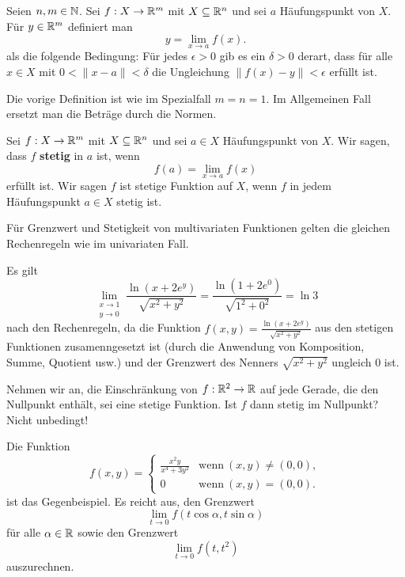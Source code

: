 \begin{defn}
	Seien $n,m \in \mathbb{N}$. 
	Sei $f : X \to \mathbb{R}^m$ mit $X \subseteq \mathbb{R}^n$ und sei $a$ Häufungspunkt von $X$. Für $y \in \mathbb{R}^m$ definiert man 
	\[
		y = \lim_{x \to a} f(x). 
	\]
	als die folgende Bedingung: Für jedes $\epsilon>0$ gib es ein $\delta>0$ derart, dass für alle $x \in X$ mit $0 < \|x - a\| < \delta$ die Ungleichung $\|f(x) - y\| < \epsilon$ erfüllt ist.  
\end{defn} 

\begin{bem}
	Die vorige Definition ist wie im Spezialfall $m=n=1$. Im Allgemeinen Fall ersetzt man die Beträge durch die Normen. 
\end{bem} 

\begin{defn}
	Sei $f : X \to \mathbb{R}^m$ mit $X \subseteq \mathbb{R}^n$ und sei $a \in X$ Häufungspunkt von $X$. Wir sagen, dass $f$ \textbf{stetig} in $a$ ist, wenn 
	\[
		f(a) = \lim_{x \to a} f(x) 
	\]
	erfüllt ist. Wir sagen $f$ ist stetige Funktion auf $X$, wenn $f$ in jedem Häufungspunkt $a \in X$ stetig ist. 
\end{defn} 

\begin{bem}
	Für Grenzwert und Stetigkeit von multivariaten Funktionen gelten die gleichen Rechenregeln wie im univariaten Fall. 
\end{bem} 

\begin{bsp} %
	Es gilt
	\[
		\lim_{\substack{x \to 1 \\ y \to 0}} \frac{\ln (x+ 2 e^y)}{\sqrt{x^2 + y^2}} = \frac{\ln ( 1 + 2 e^0 ) }{\sqrt{1^2 + 0^2}}  = \ln 3
	\]
	nach den Rechenregeln, da die Funktion $f(x,y) = \frac{\ln (x+ 2 e^y)}{\sqrt{x^2 + y^2}}$ aus den stetigen Funktionen zusamenngesetzt ist (durch die Anwendung von Komposition, Summe, Quotient usw.) und der Grenzwert des Nenners $\sqrt{x^2 + y^2}$ ungleich $0$ ist. 
\end{bsp} 

\begin{aufg} %
	Nehmen wir an, die Einschränkung von $f : \mathbb{R}^2 \to \mathbb{R}$ auf jede Gerade, die den Nullpunkt enthält, sei eine stetige Funktion. Ist $f$ dann stetig im Nullpunkt? {\color{red} Nicht unbedingt! }
	
	Die Funktion 
	\[
		f(x,y ) = 
		\begin{cases}
			\frac{x^2 y}{ x^4 + 3 y^2} & \text{wenn} \ (x,y) \ne (0,0),
			\\ 0 & \text{wenn} \ (x,y)=(0,0).
		\end{cases} 
	\]
	ist das Gegenbeispiel. Es reicht aus, den Grenzwert
	\[
		\lim_{t \to 0} f(t \cos \alpha, t \sin \alpha) 
	\]
	für alle $\alpha \in \mathbb{R}$ sowie den Grenzwert 
	\[
		\lim_{t \to 0} f(t,t^2) 
	\]
	auszurechnen.
	
\end{aufg} 

